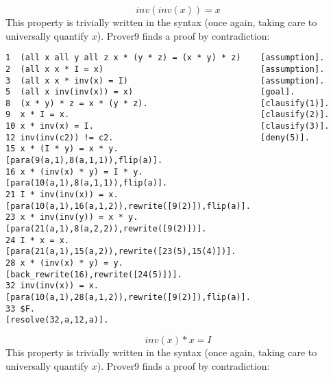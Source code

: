 \documentclass[12pt]{article}
\begin{document}
\begin{equation*}
    inv(inv(x)) = x
\end{equation*}
This property is trivially written in the syntax (once again, taking care to 
universally quantify $x$). Prover9 finds a proof by contradiction:

\begin{lstlisting}
1  (all x all y all z x * (y * z) = (x * y) * z)    [assumption].
2  (all x x * I = x)                                [assumption].
3  (all x x * inv(x) = I)                           [assumption].
5  (all x inv(inv(x)) = x)                          [goal].
8  (x * y) * z = x * (y * z).                       [clausify(1)].
9  x * I = x.                                       [clausify(2)].
10 x * inv(x) = I.                                  [clausify(3)].
12 inv(inv(c2)) != c2.                              [deny(5)].
15 x * (I * y) = x * y.                             [para(9(a,1),8(a,1,1)),flip(a)].
16 x * (inv(x) * y) = I * y.                        [para(10(a,1),8(a,1,1)),flip(a)].
21 I * inv(inv(x)) = x.                             [para(10(a,1),16(a,1,2)),rewrite([9(2)]),flip(a)].
23 x * inv(inv(y)) = x * y.                         [para(21(a,1),8(a,2,2)),rewrite([9(2)])].
24 I * x = x.                                       [para(21(a,1),15(a,2)),rewrite([23(5),15(4)])].
28 x * (inv(x) * y) = y.                            [back_rewrite(16),rewrite([24(5)])].
32 inv(inv(x)) = x.                                 [para(10(a,1),28(a,1,2)),rewrite([9(2)]),flip(a)].
33 $F.                                              [resolve(32,a,12,a)].
\end{lstlisting}

\vspace{3mm}

\begin{equation*}
    inv(x) * x = I
\end{equation*}
This property is trivially written in the syntax (once again, taking care to 
universally quantify $x$). Prover9 finds a proof by contradiction:
\end{document}
